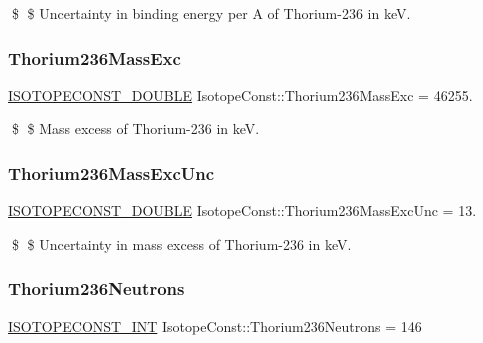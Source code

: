 \$ \$ Uncertainty in binding energy per A of Thorium-\/236 in keV. \mbox{\label{group___isotope_const-_thorium-_th236_ga5062b359ce01e51490098dc1c5a311f6}} 
\subsubsection{\texorpdfstring{Thorium236\+Mass\+Exc}{Thorium236MassExc}}
{\footnotesize\ttfamily \mbox{\hyperlink{group___isotope_const-_macros_ga8f45a7272ce02c0b4c65c44636ed719a}{I\+S\+O\+T\+O\+P\+E\+C\+O\+N\+S\+T\+\_\+\+D\+O\+U\+B\+LE}} Isotope\+Const\+::\+Thorium236\+Mass\+Exc = 46255.}

\$ \$ Mass excess of Thorium-\/236 in keV. \mbox{\label{group___isotope_const-_thorium-_th236_ga07095e4f819a611d1841e18ec58828d3}} 
\subsubsection{\texorpdfstring{Thorium236\+Mass\+Exc\+Unc}{Thorium236MassExcUnc}}
{\footnotesize\ttfamily \mbox{\hyperlink{group___isotope_const-_macros_ga8f45a7272ce02c0b4c65c44636ed719a}{I\+S\+O\+T\+O\+P\+E\+C\+O\+N\+S\+T\+\_\+\+D\+O\+U\+B\+LE}} Isotope\+Const\+::\+Thorium236\+Mass\+Exc\+Unc = 13.}

\$ \$ Uncertainty in mass excess of Thorium-\/236 in keV. \mbox{\label{group___isotope_const-_thorium-_th236_ga94688f82c76c667993070af95b74ba1e}} 
\subsubsection{\texorpdfstring{Thorium236\+Neutrons}{Thorium236Neutrons}}
{\footnotesize\ttfamily \mbox{\hyperlink{group___isotope_const-_macros_ga5f18360b3e99483a35c32d789e62621c}{I\+S\+O\+T\+O\+P\+E\+C\+O\+N\+S\+T\+\_\+\+I\+NT}} Isotope\+Const\+::\+Thorium236\+Neutrons = 146}

